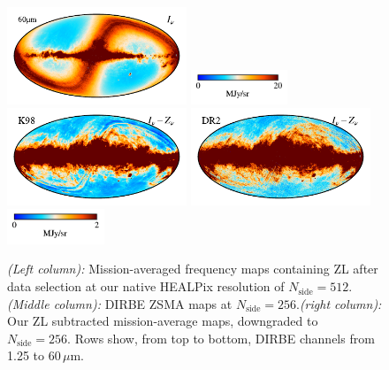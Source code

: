 \documentclass[twocolumn]{aa}
\begin{document}
\begin{figure}
    \includegraphics[height=2.90cm]{figs/compare_zsma/cosmoglobe_ma_07.pdf}%
    \includegraphics[width=2.90cm,angle=90]{figs/compare_zsma/cbar_tot_07.pdf}%
    \includegraphics[height=2.90cm]{figs/compare_zsma/dirbe_zsma_07.pdf}%
    \includegraphics[height=2.90cm]{figs/compare_zsma/cosmoglobe_zsma_07.pdf}%
    \includegraphics[width=2.90cm,angle=90]{figs/compare_zsma/cbar_07.pdf}%
      \\
    \caption{\textit{(Left column):} Mission-averaged frequency maps containing ZL after data selection at our native HEALPix resolution 
    of $N_\mathrm{side} = 512$. \textit{(Middle column):} DIRBE ZSMA maps
    at $N_\mathrm{side} = 256$.\textit{(right column):} Our ZL subtracted mission-average 
    maps, downgraded to $N_\mathrm{side} = 256$. Rows show, from top to 
    bottom, DIRBE channels from 1.25 to 60$\,\mu$m. 
    }
    \label{fig:dr2-zsma-compare1}
\end{figure}
\end{document}
